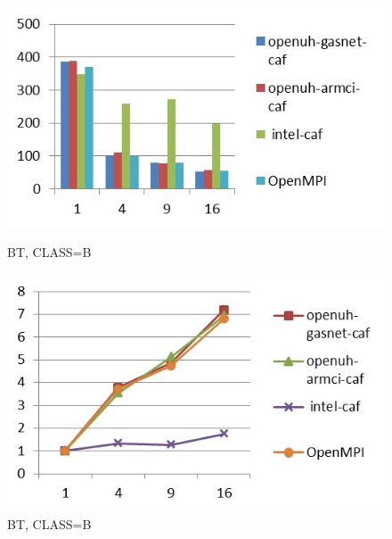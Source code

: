 \begin{figure}[ht]
\begin{minipage}[b]{0.45\linewidth}
\centering
\includegraphics[width=\textwidth]{./figures/bt_B_time.jpg}
\caption{BT, CLASS=B}
\label{fig:figure1}
\end{minipage}
\hspace{0.5cm}
\begin{minipage}[b]{0.45\linewidth}
\centering
\includegraphics[width=\textwidth]{./figures/bt_B_scalability.jpg}
\caption{BT, CLASS=B}
\label{fig:figure2}
\end{minipage}
\end{figure}


